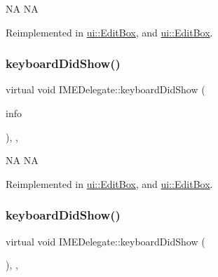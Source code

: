 NA  NA 

Reimplemented in \hyperlink{classui_1_1EditBox_a3898b6685b2693973a59d68c328952a0}{ui\+::\+Edit\+Box}, and \hyperlink{classui_1_1EditBox_a54e44ca3b05a55e0498f6471a33a0c74}{ui\+::\+Edit\+Box}.

\mbox{\label{classIMEDelegate_a3d55e52ab965ccfdacaed053484785e9}} 
\subsubsection{\texorpdfstring{keyboard\+Did\+Show()}{keyboardDidShow()}\hspace{0.1cm}{\footnotesize\ttfamily [1/2]}}
{\footnotesize\ttfamily virtual void I\+M\+E\+Delegate\+::keyboard\+Did\+Show (\begin{DoxyParamCaption}\item[{\hyperlink{structIMEKeyboardNotificationInfo}{I\+M\+E\+Keyboard\+Notification\+Info} \&}]{info }\end{DoxyParamCaption})\hspace{0.3cm}{\ttfamily [inline]}, {\ttfamily [protected]}, {\ttfamily [virtual]}}

NA  NA 

Reimplemented in \hyperlink{classui_1_1EditBox_ad5095cb70eebd06257e074c7b043ea89}{ui\+::\+Edit\+Box}, and \hyperlink{classui_1_1EditBox_a88c3e0a04a3857cacfc6cab7850fb8e0}{ui\+::\+Edit\+Box}.

\mbox{\label{classIMEDelegate_aaf4d7a4f595decda8ffa2637c9a12b37}} 
\subsubsection{\texorpdfstring{keyboard\+Did\+Show()}{keyboardDidShow()}\hspace{0.1cm}{\footnotesize\ttfamily [2/2]}}
{\footnotesize\ttfamily virtual void I\+M\+E\+Delegate\+::keyboard\+Did\+Show (\begin{DoxyParamCaption}\item[{\hyperlink{structIMEKeyboardNotificationInfo}{I\+M\+E\+Keyboard\+Notification\+Info} \&}]{ }\end{DoxyParamCaption})\hspace{0.3cm}{\ttfamily [inline]}, {\ttfamily [protected]}, {\ttfamily [virtual]}}

